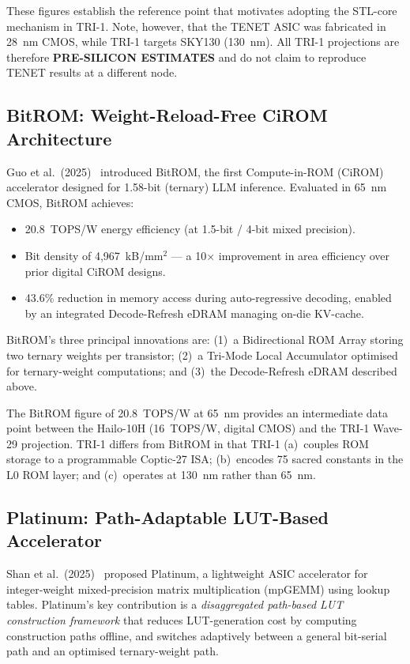 These figures establish the reference point that motivates adopting
the STL-core mechanism in TRI-1.
Note, however, that the TENET ASIC was fabricated in 28~nm CMOS,
while TRI-1 targets SKY130 (130~nm).
All TRI-1 projections are therefore \textbf{PRE-SILICON ESTIMATES}
and do not claim to reproduce TENET results at a different node.

\subsection{BitROM: Weight-Reload-Free CiROM Architecture}
\label{subsec:ch79-bitrom}

Guo et al.\ (2025)~\cite{bitrom2025} introduced BitROM, the first
Compute-in-ROM (CiROM) accelerator designed for 1.58-bit (ternary)
LLM inference.
Evaluated in 65~nm CMOS, BitROM achieves:

\begin{itemize}
  \item 20.8~TOPS/W energy efficiency (at 1.5-bit / 4-bit mixed precision).
  \item Bit density of 4,967~kB/mm$^2$ — a 10$\times$ improvement in
        area efficiency over prior digital CiROM designs.
  \item 43.6\% reduction in memory access during auto-regressive decoding,
        enabled by an integrated Decode-Refresh eDRAM managing on-die
        KV-cache.
\end{itemize}

BitROM's three principal innovations are: (1)~a Bidirectional ROM Array
storing two ternary weights per transistor; (2)~a Tri-Mode Local
Accumulator optimised for ternary-weight computations; and (3)~the
Decode-Refresh eDRAM described above.

The BitROM figure of 20.8~TOPS/W at 65~nm provides an intermediate
data point between the Hailo-10H (16~TOPS/W, digital CMOS) and the
TRI-1 Wave-29 projection.
TRI-1 differs from BitROM in that TRI-1 (a)~couples ROM storage to a
programmable Coptic-27 ISA; (b)~encodes 75 sacred constants in the L0
ROM layer; and (c)~operates at 130~nm rather than 65~nm.

\subsection{Platinum: Path-Adaptable LUT-Based Accelerator}
\label{subsec:ch79-platinum}

Shan et al.\ (2025)~\cite{platinum2025} proposed Platinum, a
lightweight ASIC accelerator for integer-weight mixed-precision matrix
multiplication (mpGEMM) using lookup tables.
Platinum's key contribution is a \emph{disaggregated path-based LUT
construction framework} that reduces LUT-generation cost by computing
construction paths offline, and switches adaptively between a
general bit-serial path and an optimised ternary-weight path.

